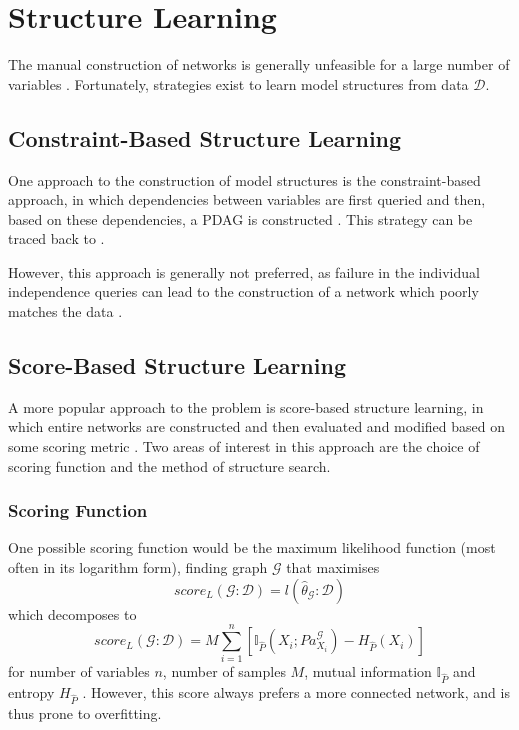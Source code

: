 \documentclass [11pt]{article}
\begin{document}
\section{Structure Learning}\label{StructureLearning}
The manual construction of networks is generally unfeasible for a large number of variables \citep{koller09}. Fortunately, strategies exist to learn model structures from data $\mathcal{D}$.
\subsection{Constraint-Based Structure Learning}\label{ConstraintBasedStructureLearning}
One approach to the construction of model structures is the constraint-based approach, in which dependencies between variables are first queried and then, based on these dependencies, a PDAG is constructed \citep{koller09}. This strategy can be traced back to \citet{verma91}. 

However, this approach is generally not preferred, as failure in the individual independence queries can lead to the construction of a network which poorly matches the data \citep{koller09}.
\subsection{Score-Based Structure Learning}\label{ScoreBasedStructureLearning}
A more popular approach to the problem is score-based structure learning, in which entire networks are constructed and then evaluated and modified based on some scoring metric \citep{koller09}. Two areas of interest in this approach are the choice of scoring function and the method of structure search.
\subsubsection{Scoring Function}
One possible scoring function would be the maximum likelihood function (most often in its logarithm form), finding graph $\mathcal{G}$ that maximises
\begin{equation*}
score_{L}(\mathcal{G}:\mathcal{D}) = l(\hat{\theta}_{\mathcal{G}}:\mathcal{D})
\end{equation*}
which decomposes to
\begin{equation*}
score_{L}(\mathcal{G}:\mathcal{D}) = M\sum_{i=1}^{n}[\mathbb{I}_{\hat{P}}(X_{i};Pa_{X_{i}}^{\mathcal{G}})-H_{\hat{P}}(X_{i})]
\end{equation*}
for number of variables $n$, number of samples $M$, mutual information $\mathbb{I}_{\hat{P}}$ and entropy $H_{\hat{P}}$ \citep{koller09}. However, this score always prefers a more connected network, and is thus prone to overfitting.
\end{document}
